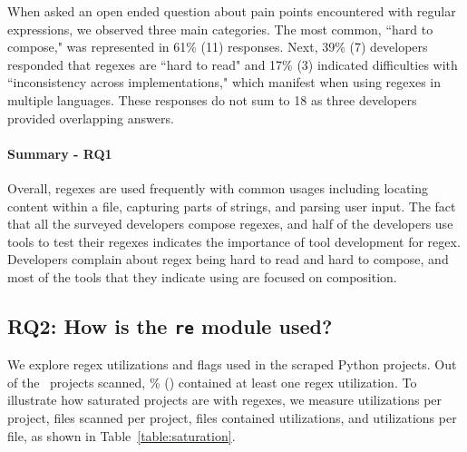 When asked an open ended question about pain points encountered with regular expressions, we observed three main categories. The most common, ``hard to compose," was represented in 61\% (11) responses. Next,
 39\% (7) developers responded that regexes are ``hard to read" and 17\% (3) indicated difficulties with ``inconsistency across implementations," which manifest when using regexes in multiple languages. These responses do not sum to 18 as three developers provided overlapping  answers.

\paragraph{Summary - RQ1}

Overall, regexes are used frequently with common usages including locating content within a file, capturing parts of strings, and parsing user input.
The fact that all the surveyed developers compose regexes, and half of the developers use tools to test their regexes indicates the importance of tool development for regex.  Developers complain about regex being hard to read and hard to compose, and most of the tools that they indicate using are focused on composition.



\subsection{RQ2: How  is the {\tt re} module used?}
We explore regex utilizations and flags used in the scraped Python projects.
Out of the \ projects scanned, \% () contained at least one regex utilization.  To illustrate how saturated projects are with regexes, we measure utilizations per project, files scanned per project, files contained utilizations, and  utilizations  per file, as shown in Table~\ref{table:saturation}.

